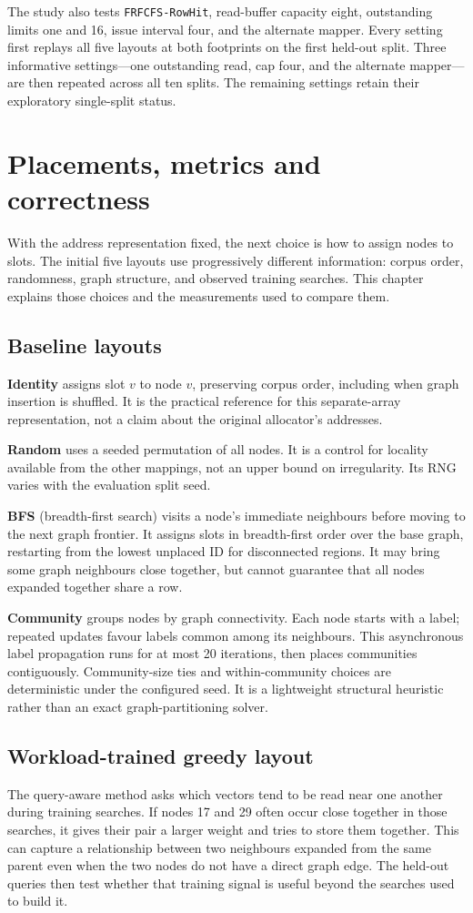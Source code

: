 \documentclass[11pt,a4paper]{report}
\newcommand{\QA}{query-aware}
\begin{document}
The study also tests \texttt{FRFCFS-RowHit}, read-buffer capacity eight, outstanding limits one and 16, issue interval four, and the alternate mapper. Every setting first replays all five layouts at both footprints on the first held-out split. Three informative settings---one outstanding read, cap four, and the alternate mapper---are then repeated across all ten splits. The remaining settings retain their exploratory single-split status.

\section{Placements, metrics and correctness}
With the address representation fixed, the next choice is how to assign nodes to slots. The initial five layouts use progressively different information: corpus order, randomness, graph structure, and observed training searches. This chapter explains those choices and the measurements used to compare them.
\subsection{Baseline layouts}
\textbf{Identity} assigns slot $v$ to node $v$, preserving corpus order, including when graph insertion is shuffled. It is the practical reference for this separate-array representation, not a claim about the original allocator's addresses.

\textbf{Random} uses a seeded permutation of all nodes. It is a control for locality available from the other mappings, not an upper bound on irregularity. Its RNG varies with the evaluation split seed.

\textbf{BFS} (breadth-first search) visits a node's immediate neighbours before moving to the next graph frontier. It assigns slots in breadth-first order over the base graph, restarting from the lowest unplaced ID for disconnected regions. It may bring some graph neighbours close together, but cannot guarantee that all nodes expanded together share a row.

\textbf{Community} groups nodes by graph connectivity. Each node starts with a label; repeated updates favour labels common among its neighbours. This asynchronous label propagation runs for at most 20 iterations, then places communities contiguously. Community-size ties and within-community choices are deterministic under the configured seed. It is a lightweight structural heuristic rather than an exact graph-partitioning solver.

\subsection{Workload-trained greedy layout}
The \QA{} method asks which vectors tend to be read near one another during training searches. If nodes 17 and 29 often occur close together in those searches, it gives their pair a larger weight and tries to store them together. This can capture a relationship between two neighbours expanded from the same parent even when the two nodes do not have a direct graph edge. The held-out queries then test whether that training signal is useful beyond the searches used to build it.
\end{document}
